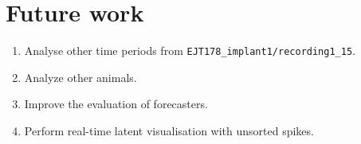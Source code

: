 \documentclass[12pt]{article}
\begin{document}
\section{Future work}

\begin{enumerate}

    \item Analyse other time periods from 
    \texttt{EJT178\_implant1/recording1\_15}.

    \item Analyze other animals.

    \item Improve the evaluation of forecasters.

    \item Perform real-time latent visualisation with unsorted spikes.

\end{enumerate}



\end{document}

